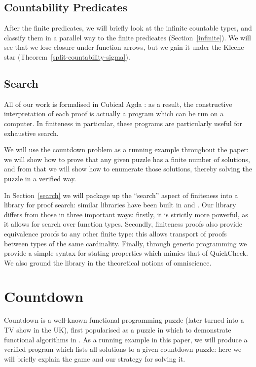 \subsection{Countability Predicates}
After the finite predicates, we will briefly look at the infinite countable
types, and classify them in a parallel way to the finite predicates
(Section~\ref{infinite}).
We will see that we lose closure under function arrows, but we gain it under the
Kleene star (Theorem~\ref{split-countability-sigma}).
\subsection{Search}
All of our work is formalised in Cubical Agda
\cite{vezzosiCubicalAgdaDependently2019}: as a result, the constructive
interpretation of each proof is actually a program which can be run on a
computer.
In finiteness in particular, these programs are particularly useful for
exhaustive search.

We will use the countdown problem as a running example throughout the paper: we
will show how to prove that any given puzzle has a finite number of solutions,
and from that we will show how to enumerate those solutions, thereby solving the
puzzle in a verified way.

In Section~\ref{search} we will package up the ``search'' aspect of finiteness
into a library for proof search: similar libraries have been built in
\cite{fruminFiniteSetsHomotopy2018} and
\cite{firsovDependentlyTypedProgramming2015}.
Our library differs from those in three important ways: firstly, it is strictly
more powerful, as it allows for search over function types.
Secondly, finiteness proofs also provide equivalence proofs to any other finite
type: this allows transport of proofs between types of the same cardinality.
Finally, through generic programming we provide a simple syntax for stating
properties which mimics that of QuickCheck.
We also ground the library in the theoretical notions of omniscience.
\section{Countdown}
Countdown is a well-known functional programming puzzle (later turned into a TV
show in the UK), first popularised as a puzzle in which to demonstrate
functional algorithms in \cite{huttonCountdownProblem2002}.
As a running example in this paper, we will produce a verified program which
lists all solutions to a given countdown puzzle: here we will briefly explain
the game and our strategy for solving it.


